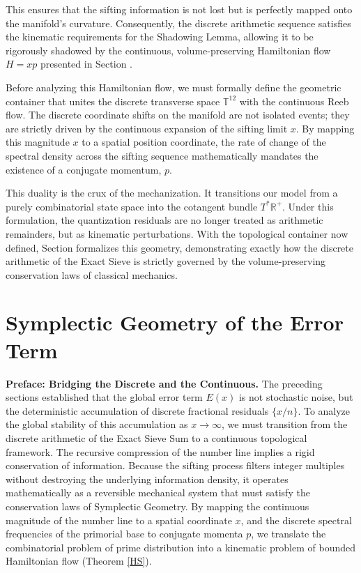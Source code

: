 \documentclass[sn-mathphys-num, pdflatex, referee]{sn-jnl}
\begin{document}
This ensures that the sifting information is not lost but is perfectly mapped onto the manifold's curvature. Consequently, the discrete arithmetic sequence satisfies the kinematic requirements for the Shadowing Lemma, allowing it to be rigorously shadowed by the continuous, volume-preserving Hamiltonian flow $H=xp$ presented in Section .

Before analyzing this Hamiltonian flow, we must formally define the geometric container that unites the discrete transverse space $\mathbb{T}^{12}$ with the continuous Reeb flow. The discrete coordinate shifts on the manifold are not isolated events; they are strictly driven by the continuous expansion of the sifting limit $x$. By mapping this magnitude $x$ to a spatial position coordinate, the rate of change of the spectral density across the sifting sequence mathematically mandates the existence of a conjugate momentum, $p$. 

This duality is the crux of the mechanization. It transitions our model from a purely combinatorial state space into the cotangent bundle $T^*\mathbb{R}^+$. Under this formulation, the quantization residuals are no longer treated as arithmetic remainders, but as kinematic perturbations. With the topological container now defined, Section  formalizes this geometry, demonstrating exactly how the discrete arithmetic of the Exact Sieve is strictly governed by the volume-preserving conservation laws of classical mechanics.
\section{Symplectic Geometry of the Error Term}
\label{SG}
\textbf{Preface: Bridging the Discrete and the Continuous.} The preceding sections established that the global error term $E(x)$ is not stochastic noise, but the deterministic accumulation of discrete fractional residuals $\{x/n\}$. To analyze the global stability of this accumulation as $x \rightarrow \infty$, we must transition from the discrete arithmetic of the Exact Sieve Sum to a continuous topological framework. The recursive compression of the number line implies a rigid conservation of information. Because the sifting process filters integer multiples without destroying the underlying information density, it operates mathematically as a reversible mechanical system that must satisfy the conservation laws of Symplectic Geometry. By mapping the continuous magnitude of the number line to a spatial coordinate $x$, and the discrete spectral frequencies of the primorial base to conjugate momenta $p$, we translate the combinatorial problem of prime distribution into a kinematic problem of bounded Hamiltonian flow (Theorem \ref{HS}).
\end{document}
